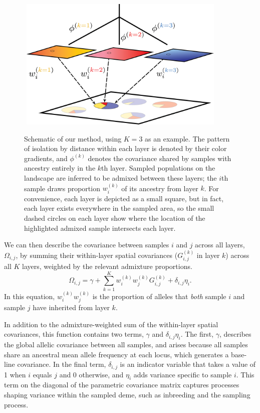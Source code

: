 \documentclass[12pt]{article}
\begin{document}
\begin{figure}
	\centering
		{\includegraphics[width=4in,height=2.5in]{figs/schematic/method_schematic.png}}
		\caption{Schematic of our method, using $K=3$ as an example.
			     The pattern of isolation by distance within each layer is denoted by their color gradients, 
			     and $\phi^{(k)}$ denotes the covariance shared by samples with ancestry entirely in the $k$th layer.
			     Sampled populations on the landscape are inferred to be admixed between these layers; 
			     the $i$th sample draws proportion $w^{(k)}_i$ of its ancestry from layer $k$.
			     For convenience, each layer is depicted as a small square, but in fact, 
			     each layer exists everywhere in the sampled area,
			     so the small dashed circles on each layer show where 
			     the location of the highlighted admixed sample intersects each layer.
			    }\label{schematic}
\end{figure}

We can then describe the covariance between samples $i$ and $j$ across all layers, $\Omega_{i,j}$,
by summing their within-layer spatial covariances ($G_{i,j}^{(k)}$ in layer $k$) across all $K$ layers,
weighted by the relevant admixture proportions.
\begin{equation}
    \Omega_{i,j} = \gamma + \sum_{k=1}^K w^{(k)}_i w^{(k)}_j
G^{(k)}_{i,j} + \delta_{i,j}\eta_i .
\label{cross_layer_covariance}
\end{equation}
In this equation, $w^{(k)}_i w^{(k)}_j$ is the proportion of alleles that \emph{both}
sample $i$ and sample $j$ have inherited from layer $k$.

In addition to the admixture-weighted sum of the within-layer spatial covariances,
this function contains two terms, $\gamma$ and $\delta_{i,j}\eta_i$.
The first, $\gamma$, describes the global allelic covariance between all samples, 
and arises because all samples share an ancestral mean allele frequency at each locus,
which generates a base-line covariance.
In the final term, $\delta_{i,j}$ is an indicator variable that takes a value of 1 when $i$ equals $j$ and 0 otherwise,
and $\eta_i$ adds variance specific to sample $i$.
This term on the diagonal of the parametric covariance matrix captures processes shaping variance within the sampled deme, 
such as inbreeding and the sampling process.
\end{document}

